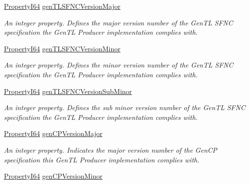 \begin{DoxyCompactItemize}
\hyperlink{group___common_interface_ga81749b2696755513663492664a18a893}{Property\+I64} \hyperlink{classmv_i_m_p_a_c_t_1_1acquire_1_1_gen_i_cam_1_1_system_module_a310d740a20bad8729d066423d5445df0}{gen\+T\+L\+S\+F\+N\+C\+Version\+Major}
\begin{DoxyCompactList}\small\item\em An integer property. Defines the major version number of the Gen\+T\+L S\+F\+N\+C specification the Gen\+T\+L Producer implementation complies with. \end{DoxyCompactList}\item 
\hyperlink{group___common_interface_ga81749b2696755513663492664a18a893}{Property\+I64} \hyperlink{classmv_i_m_p_a_c_t_1_1acquire_1_1_gen_i_cam_1_1_system_module_ae852c6e9fe3e60c10184a5a8529c87ed}{gen\+T\+L\+S\+F\+N\+C\+Version\+Minor}
\begin{DoxyCompactList}\small\item\em An integer property. Defines the minor version number of the Gen\+T\+L S\+F\+N\+C specification the Gen\+T\+L Producer implementation complies with. \end{DoxyCompactList}\item 
\hyperlink{group___common_interface_ga81749b2696755513663492664a18a893}{Property\+I64} \hyperlink{classmv_i_m_p_a_c_t_1_1acquire_1_1_gen_i_cam_1_1_system_module_afd11b3d1a0c1a59a0bf1b9762c0e8dfb}{gen\+T\+L\+S\+F\+N\+C\+Version\+Sub\+Minor}
\begin{DoxyCompactList}\small\item\em An integer property. Defines the sub minor version number of the Gen\+T\+L S\+F\+N\+C specification the Gen\+T\+L Producer implementation complies with. \end{DoxyCompactList}\item 
\hyperlink{group___common_interface_ga81749b2696755513663492664a18a893}{Property\+I64} \hyperlink{classmv_i_m_p_a_c_t_1_1acquire_1_1_gen_i_cam_1_1_system_module_a2f65ada43ea781c0a47a094deb7dd39e}{gen\+C\+P\+Version\+Major}
\begin{DoxyCompactList}\small\item\em An integer property. Indicates the major version number of the Gen\+C\+P specification this Gen\+T\+L Producer implementation complies with. \end{DoxyCompactList}\item 
\hyperlink{group___common_interface_ga81749b2696755513663492664a18a893}{Property\+I64} \hyperlink{classmv_i_m_p_a_c_t_1_1acquire_1_1_gen_i_cam_1_1_system_module_ae40cc61bb868b23e61acd184e1a5b5b9}{gen\+C\+P\+Version\+Minor}

\end{DoxyCompactItemize}

